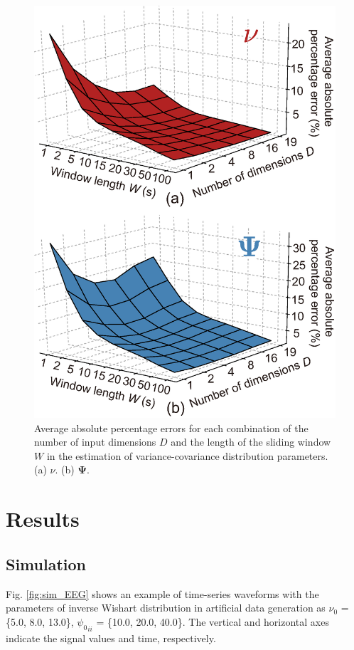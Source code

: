 \documentclass[journal]{IEEEtran}
\begin{document}
\begin{figure}[!t]
\centering
\includegraphics[width=0.8\hsize]{figure/AAPE_color_dim_fro_time.eps}
\caption{Average absolute percentage errors for each combination of the number of input dimensions $D$ and the length of the sliding window $W$ in the estimation of variance-covariance distribution parameters. (a) $\nu$. (b) $\mathbf{\Psi}$.}
\label{fig:ES_param}
\end{figure}

\section{Results}
\subsection{Simulation}
Fig. \ref{fig:sim_EEG} shows an example of time-series waveforms with the parameters of inverse Wishart distribution in artificial data generation as $\nu_0$ = \{5.0, 8.0, 13.0\}, ${\psi_0}_{ii}$ = \{10.0, 20.0, 40.0\}. The vertical and horizontal axes indicate the signal values and time, respectively.
\end{document}
